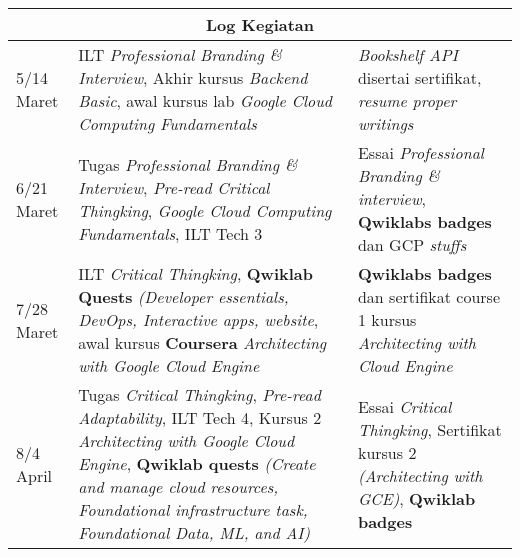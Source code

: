 \begin{tabular}{ |p{3cm}|p{6cm}|p{3cm}|  }
 \hline
 \multicolumn{3}{|c|}{Log Kegiatan} \\
 \hline
5/14 Maret & ILT \textit{Professional Branding \& Interview}, Akhir kursus \textit{Backend Basic}, awal kursus lab \textit{Google Cloud Computing Fundamentals} & \textit{Bookshelf API} disertai sertifikat, \textit{resume proper writings} \\
 \hline
 6/21 Maret & Tugas \textit{Professional Branding \& Interview}, \textit{Pre-read Critical Thingking}, \textit{Google Cloud Computing Fundamentals}, ILT Tech 3 & Essai \textit{Professional Branding \& interview}, \textbf{Qwiklabs badges} dan GCP \textit{stuffs} \\
 \hline
 7/28 Maret & ILT \textit{Critical Thingking}, \textbf{Qwiklab Quests} \textit{(Developer essentials, DevOps, Interactive apps, website}, awal kursus \textbf{Coursera} \textit{Architecting with Google Cloud Engine} & \textbf{Qwiklabs badges} dan sertifikat course 1 kursus \textit{Architecting with Cloud Engine} \\
 \hline
 8/4 April & Tugas \textit{Critical Thingking}, \textit{Pre-read Adaptability}, ILT Tech 4, Kursus 2 \textit{Architecting with Google Cloud Engine}, \textbf{Qwiklab quests} \textit{(Create and manage cloud resources, Foundational infrastructure task, Foundational Data, ML, and AI)} & Essai \textit{Critical Thingking}, Sertifikat kursus 2 \textit{(Architecting with GCE)}, \textbf{Qwiklab badges} \\
 \hline
 \end{tabular}